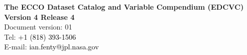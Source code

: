 \pagebreak
\begin{center}
    \vspace*{2cm}
    {\Large \textbf{The ECCO Dataset Catalog and Variable Compendium (EDCVC)}}\\[3cm]
    {\LARGE \textbf{Version 4 Release 4}}\\[2.5cm]
    {\Large Document version: 01}\\[4cm]
    {\large Tel: \textcolor{black}{+1 (818) 393-1506}\\[.5cm]
    E-mail: \textcolor{black}{ian.fenty@jpl.nasa.gov}}\\[2cm]
\end{center}
\newpage
